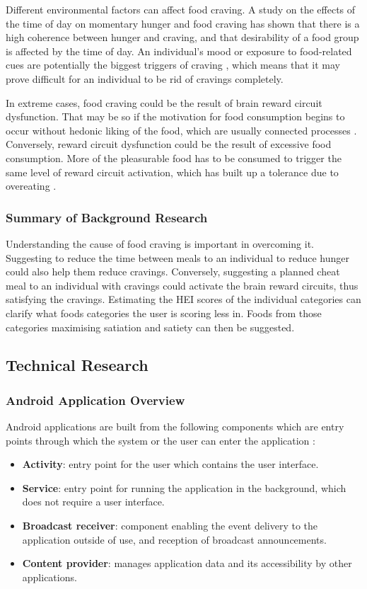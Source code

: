 \documentclass{article}
\begin{document}
\noindent Different environmental factors can affect food craving. A study on the effects of the time of day on momentary hunger and food craving \cite{craving_time} has shown that there is a high coherence between hunger and craving, and that desirability of a food group is affected by the time of day. An individual's mood or exposure to food-related cues are potentially the biggest triggers of craving \cite{craving_sweets}, which means that it may prove difficult for an individual to be rid of cravings completely. 
\bigskip

\noindent In extreme cases, food craving could be the result of brain reward circuit dysfunction. That may be so if the motivation for food consumption begins to occur without hedonic liking of the food, which are usually connected processes \cite{tempted_brain}. Conversely, reward circuit dysfunction could be the result of excessive food consumption. More of the pleasurable food has to be consumed to trigger the same level of reward circuit activation, which has built up a tolerance due to overeating \cite{tempted_brain}.
\bigskip

\subsubsection{Summary of Background Research}
Understanding the cause of food craving is important in overcoming it. Suggesting to reduce the time between meals to an individual to reduce hunger could also help them reduce cravings. Conversely, suggesting a planned cheat meal to an individual with cravings could activate the brain reward circuits, thus satisfying the cravings. Estimating the HEI scores of the individual categories can clarify what foods categories the user is scoring less in. Foods from those categories maximising satiation and satiety can then be suggested. 

\subsection{Technical Research} 
\subsubsection{Android Application Overview}
Android applications are built from the following components which are entry points through which the system or the user can enter the application \cite{android_fundamentals}:

\begin{itemize}
    \item \textbf{Activity}: entry point for the user which contains the user interface.
    \item \textbf{Service}: entry point for running the application in the background, which does not require a user interface.
    \item \textbf{Broadcast receiver}: component enabling the event delivery to the application outside of use, and reception of broadcast announcements. 
    \item \textbf{Content provider}: manages application data and its accessibility by other applications. 
\end{itemize}
\end{document}
